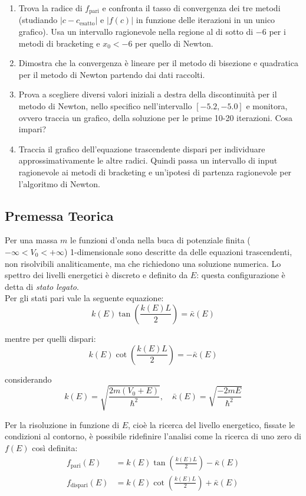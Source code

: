 \vspace{1em}
\begin{enumerate}
    \item Trova la radice di $f_{\text{pari}}$ e confronta il tasso di convergenza dei tre metodi (studiando $|c - c_{\text{esatto}}|$ e $|f(c)|$ in funzione delle iterazioni in un unico grafico). Usa un intervallo ragionevole nella regione al di sotto di $-6$ per i metodi di bracketing e $x_0 < -6$ per quello di Newton.
    
    \item Dimostra che la convergenza è lineare per il metodo di bisezione e quadratica per il metodo di Newton partendo dai dati raccolti.
    
    \item Prova a scegliere diversi valori iniziali a destra della discontinuità per il metodo di Newton, nello specifico nell'intervallo $[-5.2, -5.0]$ e monitora, ovvero traccia un grafico, della soluzione per le prime 10-20 iterazioni. Cosa impari?
    
    \item Traccia il grafico dell'equazione trascendente dispari per individuare approssimativamente le altre radici. Quindi passa un intervallo di input ragionevole ai metodi di bracketing e un'ipotesi di partenza ragionevole per l'algoritmo di Newton.
\end{enumerate}

\subsection{Premessa Teorica}
Per una massa $m$ le funzioni d'onda nella buca di potenziale finita ($-\infty <V_0<+\infty$) 1-dimensionale sono descritte da delle equazioni trascendenti, non risolvibili analiticamente, ma che richiedono una soluzione numerica. Lo spettro dei livelli energetici è discreto e definito da $E$: questa configurazione è detta di \textit{stato legato}.\\
Per gli stati pari vale la seguente equazione:
\[
k(E) \tan\left(\frac{k(E) L}{2}\right) = \bar\kappa(E)
\]

mentre per quelli dispari:
\[
k(E) \cot\left(\frac{k(E) L}{2}\right) = -\bar\kappa(E)
\]

considerando
\[
k(E) = \sqrt{\frac{2 m (V_0 + E)}{\hbar^2}}, \quad
\bar\kappa(E) = \sqrt{\frac{-2 m E}{\hbar^2}}
\]

\medskip\noindent
Per la risoluzione in funzione di $E$, cioè la ricerca del livello energetico, fissate le condizioni al contorno, è possibile ridefinire l'analisi come la ricerca di uno zero di $f(E)$ così definita:
\begin{align*}
f_\mathrm{pari}(E) &= k(E) \tan\left(\frac{k(E) L}{2}\right) - \bar\kappa(E)\\
f_\mathrm{dispari}(E) &= k(E) \cot\left(\frac{k(E) L}{2}\right) + \bar\kappa(E)
\end{align*}

